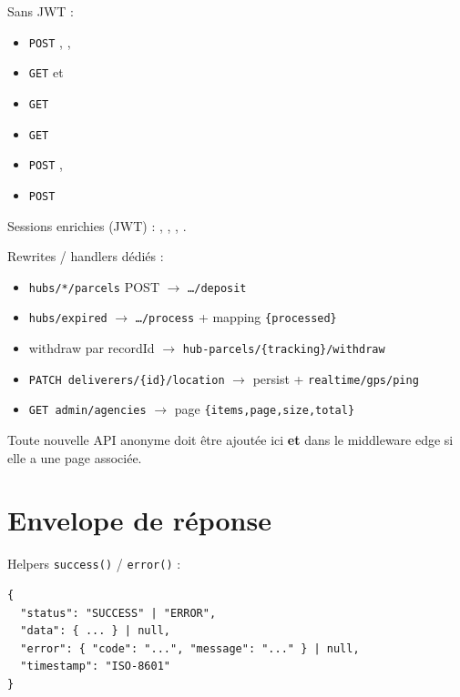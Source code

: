 Sans JWT :
\begin{itemize}
  \item \texttt{POST} , , 
  \item \texttt{GET}  et 
  \item \texttt{GET} 
  \item \texttt{GET} 
  \item \texttt{POST} , 
  \item \texttt{POST} 
\end{itemize}

Sessions enrichies (JWT) : , ,
, .

Rewrites / handlers dédiés :
\begin{itemize}
  \item \texttt{hubs/*/parcels} POST $\rightarrow$ \texttt{\ldots/deposit}
  \item \texttt{hubs/expired} $\rightarrow$ \texttt{\ldots/process} + mapping \texttt{\{processed\}}
  \item withdraw par recordId $\rightarrow$ \texttt{hub-parcels/\{tracking\}/withdraw}
  \item \texttt{PATCH deliverers/\{id\}/location} $\rightarrow$ persist + \texttt{realtime/gps/ping}
  \item \texttt{GET admin/agencies} $\rightarrow$ page \texttt{\{items,page,size,total\}}
\end{itemize}

Toute nouvelle API anonyme doit être ajoutée ici \textbf{et} dans le middleware
edge si elle a une page associée.

\section{Envelope de réponse}

Helpers \texttt{success()} / \texttt{error()} :

\begin{lstlisting}
{
  "status": "SUCCESS" | "ERROR",
  "data": { ... } | null,
  "error": { "code": "...", "message": "..." } | null,
  "timestamp": "ISO-8601"
}
\end{lstlisting}

